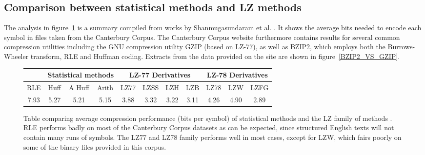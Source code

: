 \subsection{Comparison between statistical methods and LZ methods}
The analysis in figure~\ref{STATISTICAL_VS_LZ} is a summary compiled from works by Shanmugasundaram et al. \cite{shanmugasundaram2011comparative}. It shows the average bits 
needed to encode each symbol in files taken from the Canterbury Corpus. The Canterbury Corpus website furthermore contains results for several common compression utilities 
including the GNU compression utility GZIP (based on LZ-77), as well as BZIP2, which employs both the Burrows-Wheeler transform, RLE and Huffman coding. Extracts from the data 
provided on the site are shown in figure~\ref{BZIP2_VS_GZIP}.
\begin{figure}[h!]
\begin{mdframed}
\centering
\begin{tabular}{|c|c|c|c|c|c|c|c|c|c|c|}
 \hline
 & \multicolumn{3}{|c|}{Statistical methods} & \multicolumn{4}{|c|}{LZ-77 Derivatives} & \multicolumn{3}{|c|}{LZ-78 Derivatives} \\
 \hline
 RLE & Huff & A Huff & Arith & LZ77 & LZSS & LZH & LZB & LZ78 & LZW & LZFG \\
 \hline
 7.93 & 5.27 & 5.21 & 5.15 & 3.88 & 3.32 & 3.22 & 3.11 & 4.26 & 4.90 & 2.89 \\
 \hline
\end{tabular}
\caption{Table comparing average compression performance (bits per symbol) of statistical methods and the LZ family of methods \cite{shanmugasundaram2011comparative}. RLE performs
 badly on most of the Canterbury Corpus datasets as can be expected, since structured English texts will not contain many runs of symbols. The LZ77 and LZ78 family performs well in most cases,
 except for LZW, which fairs poorly on some of the binary files provided in this corpus.}
 \label{STATISTICAL_VS_LZ}
\end{mdframed}
\end{figure}
